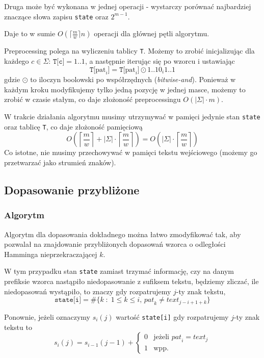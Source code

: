 \documentclass{article}
\begin{document}
Druga może być wykonana w jednej operacji - wystarczy porównać najbardziej znaczące słowa zapisu \texttt{state} oraz $2^{m-1}$.

Daje to w sumie $O(\lceil \frac{m}{w} \rceil n)$ operacji dla głównej pętli algorytmu.

Preprocessing polega na wyliczeniu tablicy \texttt{T}. Możemy to zrobić inicjalizując dla każdego $c\in \Sigma$: $\texttt{T[c]}=1..1$, a następnie iterując się po wzorcu i ustawiając $$\texttt{T[}\text{pat}_i\texttt{]} = \texttt{T[}\text{pat}_i\texttt{]} \odot 1..10_i1..1$$
gdzie $\odot$ to iloczyn boolowski po współrzędnych (\textit{bitwise-and}). Ponieważ w każdym kroku modyfikujemy tylko jedną pozycję w jednej masce, możemy to zrobić w czasie stałym, co daje złożoność preprocessingu $O(|\Sigma|\cdot m)$.

W trakcie działania algorytmu musimy utrzymywać w pamięci jedynie stan \texttt{state} oraz tablicę \texttt{T}, co daje złożoność pamięciową
$$O(\left\lceil\frac{m}{w}\right\rceil + |\Sigma|\cdot\left\lceil\frac{m}{w}\right\rceil) =
O(|\Sigma|\cdot\left\lceil\frac{m}{w}\right\rceil)$$
Co istotne, nie musimy przechowywać w pamięci tekstu wejściowego (możemy go przetwarzać jako strumień znaków).

\subsection{Dopasowanie przybliżone}
\subsubsection*{Algorytm}
Algorytm dla dopasowania dokładnego można łatwo zmodyfikować tak, aby pozwalał na znajdowanie przybliżonych dopasowań wzorca o odległości Hamminga nieprzekraczającej $k$.

W tym przypadku stan \texttt{state} zamiast trzymać informację, czy na danym prefiksie wzorca nastąpiło niedopasowanie z sufiksem tekstu, będziemy zliczać, ile niedopasowań wystąpiło, to znaczy gdy rozpatrujemy $j$-ty znak tekstu, $$\texttt{state[i]} = \#\{k\; : \;1\leq k \leq i,\, \textit{pat}_k \neq \textit{text}_{j-i+1+k}\}$$

Ponownie, jeżeli oznaczymy $s_i(j)$ wartość \texttt{state[i]} gdy rozpatrujemy $j$-ty znak tekstu to
$$
s_i(j) = s_{i-1}(j-1) + \begin{cases}
0&\text{jeżeli } \textit{pat}_i = \textit{text}_j\\
1&\text {wpp.}
\end{cases} 
$$
\end{document}
